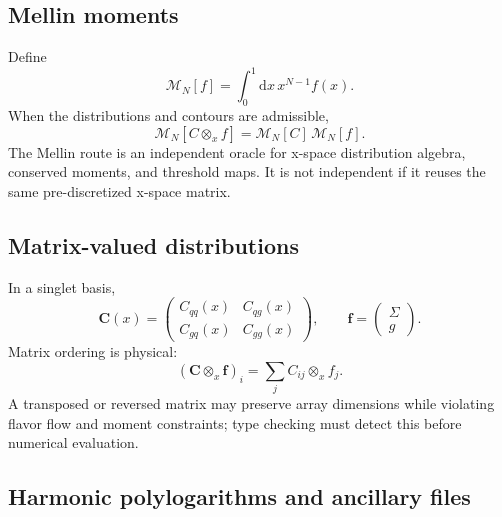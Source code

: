\documentclass[11pt]{article}
\newcommand{\dd}{\mathrm{d}}
\newcommand{\otimesx}{\mathbin{\otimes_x}}
\begin{document}
\subsection{Mellin moments}

Define
\begin{equation}
 \mathcal M_N[f]
 =
 \int_0^1\dd x\,x^{N-1}f(x).
 \label{eq:mellin}
\end{equation}
When the distributions and contours are admissible,
\begin{equation}
 \mathcal M_N[C\otimesx f]
 =
 \mathcal M_N[C]\,\mathcal M_N[f].
 \label{eq:mellin-convolution}
\end{equation}
The Mellin route is an independent oracle for x-space distribution algebra, conserved moments, and threshold maps.  It is not independent if it reuses the same pre-discretized x-space matrix.

\subsection{Matrix-valued distributions}

In a singlet basis,
\begin{equation}
 \bm C(x)
 =
 \begin{pmatrix}
 C_{qq}(x)&C_{qg}(x)\\
 C_{gq}(x)&C_{gg}(x)
 \end{pmatrix},
 \qquad
 \bm f=
 \begin{pmatrix}\Sigma\\g\end{pmatrix}.
 \label{eq:singlet-matrix}
\end{equation}
Matrix ordering is physical:
\begin{equation}
 (\bm C\otimesx\bm f)_i
 =
 \sum_j C_{ij}\otimesx f_j.
 \label{eq:matrix-convolution}
\end{equation}
A transposed or reversed matrix may preserve array dimensions while violating flavor flow and moment constraints; type checking must detect this before numerical evaluation.

\subsection{Harmonic polylogarithms and ancillary files}
\end{document}

